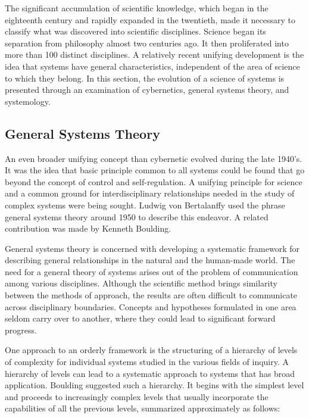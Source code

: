 The significant accumulation of scientific knowledge, which began in the eighteenth century and rapidly expanded in the twentieth, made it necessary to classify what was discovered into scientific disciplines. Science began its separation from philosophy almost two centuries ago. It then proliferated into more than 100 distinct disciplines. A relatively recent unifying development is the idea that systems have general characteristics, independent of the area of science to which they belong. In this section, the evolution of a science of systems is presented through an examination of cybernetics, general systems theory, and systemology.

\subsection{General Systems Theory}

An even broader unifying concept than cybernetic evolved during the late 1940’s. It was the idea that basic principle common to all systems could be found that go beyond the concept of control and self-regulation. A unifying principle for science and a common ground for interdisciplinary relationships needed in the study of complex systems were being sought. Ludwig von Bertalanffy used the phrase general systems theory around 1950 to describe this endeavor. A related contribution was made by Kenneth Boulding.

General systems theory is concerned with developing a systematic framework for describing general relationships in the natural and the human-made world. The need for a general theory of systems arises out of the problem of communication among various disciplines. Although the scientific method brings similarity between the methods of approach, the results are often difficult to communicate across disciplinary boundaries. Concepts and hypotheses formulated in one area seldom carry over to another, where they could lead to significant forward progress.

One approach to an orderly framework is the structuring of a hierarchy of levels of complexity for individual systems studied in the various fields of inquiry. A hierarchy of levels can lead to a systematic approach to systems that has broad application. Boulding suggested such a hierarchy. It begins with the simplest level and proceeds to increasingly complex levels that usually incorporate the capabilities of all the previous levels, summarized approximately as follows:

